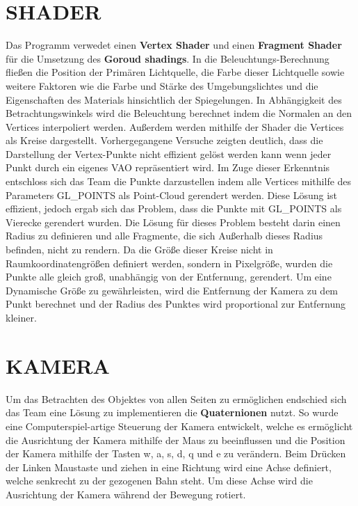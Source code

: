 	\section{\Large SHADER}
	Das Programm verwedet einen \textbf{Vertex Shader} und einen \textbf{Fragment Shader} für die Umsetzung des \textbf{Goroud shadings}. In die Beleuchtungs-Berechnung fließen die Position der Primären Lichtquelle, die Farbe dieser Lichtquelle sowie weitere Faktoren wie die Farbe und Stärke des Umgebungslichtes und die Eigenschaften des Materials hinsichtlich der Spiegelungen. In Abhängigkeit des Betrachtungswinkels wird die Beleuchtung berechnet indem die Normalen an den Vertices interpoliert werden. Außerdem werden mithilfe der Shader die Vertices als Kreise dargestellt.\newline\newline
 	Vorhergegangene Versuche zeigten deutlich, dass die Darstellung der Vertex-Punkte nicht effizient gelöst werden kann wenn jeder Punkt durch ein eigenes VAO repräsentiert wird. Im Zuge dieser Erkenntnis entschloss sich das Team die Punkte darzustellen indem alle Vertices mithilfe des Parameters GL\_POINTS als Point-Cloud gerendert werden. Diese Lösung ist effizient, jedoch ergab sich das Problem, dass die Punkte mit GL\_POINTS als Vierecke gerendert wurden. Die Lösung für dieses Problem besteht darin einen Radius zu definieren und alle Fragmente, die sich Außerhalb dieses Radius befinden, nicht zu rendern. Da die Größe dieser Kreise nicht in Raumkoordinatengrößen definiert werden, sondern in Pixelgröße, wurden die Punkte alle gleich groß, unabhängig von der Entfernung, gerendert. Um eine Dynamische Größe zu gewährleisten, wird die Entfernung der Kamera zu dem Punkt berechnet und der Radius des Punktes wird proportional zur Entfernung kleiner.
	
	\section{\Large KAMERA}
	Um das Betrachten des Objektes von allen Seiten zu ermöglichen endschied sich das Team eine Lösung zu implementieren die \textbf{Quaternionen} nutzt. So wurde eine Computerspiel-artige Steuerung der Kamera entwickelt, welche es ermöglicht die Ausrichtung der Kamera mithilfe der Maus zu beeinflussen und die Position der Kamera mithilfe der Tasten w, a, s, d, q und e zu verändern. Beim Drücken der Linken Maustaste und ziehen in eine Richtung wird eine Achse definiert, welche senkrecht zu der gezogenen Bahn steht. Um diese Achse wird die Ausrichtung der Kamera während der Bewegung rotiert.
		
